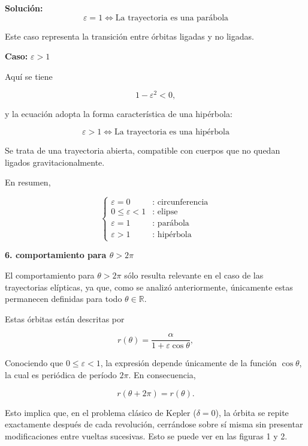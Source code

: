 \documentclass[10pt,a4paper]{article}
\newenvironment{solution}{\par\noindent\textbf{Solución: } }{}
\begin{document}
\begin{solution}
\[
\boxed{
\varepsilon=1 \iff \text{La trayectoria es una parábola}
}
\]

Este caso representa la transición entre órbitas ligadas y no ligadas.

\vspace{0.3cm}

\noindent
\textbf{Caso:} \(\varepsilon>1\)

\vspace{0.2cm}

Aquí se tiene

\[
1-\varepsilon^2<0,
\]

y la ecuación adopta la forma característica de una hipérbola:

\[
\boxed{
\varepsilon>1 \iff \text{La trayectoria es una hipérbola}
}
\]

Se trata de una trayectoria abierta, compatible con cuerpos que no quedan ligados gravitacionalmente.

\vspace{0.3cm}

En resumen,

\[
\boxed{
\begin{cases}
\varepsilon=0 & \text{: circunferencia} \\
0\leq\varepsilon<1 & \text{: elipse} \\
\varepsilon=1 & \text{: parábola} \\
\varepsilon>1 & \text{: hipérbola}
\end{cases}
}
\]
\vspace{0.5 cm}

\noindent
\textbf{\large 6. comportamiento para $\theta > 2\pi$}

\vspace{0.5 cm}

El comportamiento para \(\theta > 2\pi\) sólo resulta relevante en el caso de las trayectorias elípticas, ya que, como se analizó anteriormente, únicamente estas permanecen definidas para todo \(\theta \in \mathbb{R}\).

Estas órbitas están descritas por

\[
r(\theta)
=
\frac{\alpha}{1+\varepsilon\cos\theta},
\]

Conociendo que $0 \leq \varepsilon < 1$, la expresión depende únicamente de la función \(\cos\theta\), la cual es periódica de período \(2\pi\). En consecuencia,

\[
r(\theta+2\pi)=r(\theta).
\]

Esto implica que, en el problema clásico de Kepler (\(\delta = 0\)), la órbita se repite exactamente después de cada revolución, cerrándose sobre sí misma sin presentar modificaciones entre vueltas sucesivas. Esto se puede ver en las figuras 1 y 2.

\vspace{0.4cm}


\end{solution}
\end{document}
